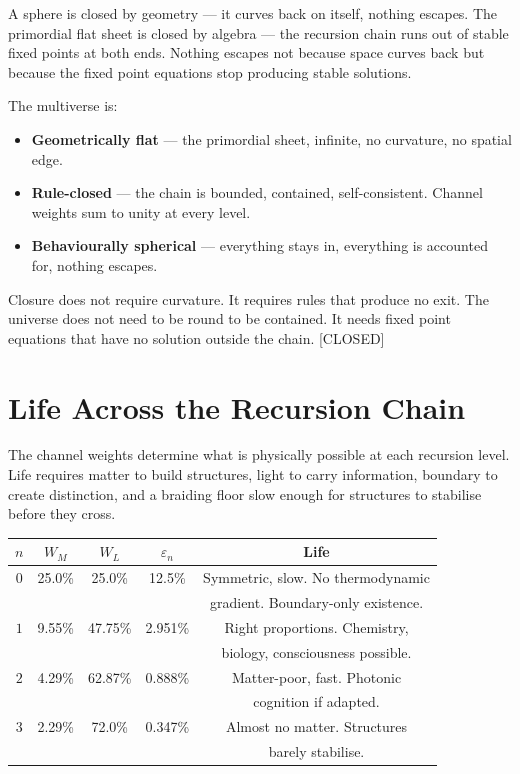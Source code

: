 \documentclass[prd,twocolumn,preprintnumbers,amsmath,amssymb]{revtex4-2}
\newcommand{\closed}{\textcolor{green!60!black}{[CLOSED]}}
\begin{document}
A sphere is closed by geometry --- it curves back on itself,
nothing escapes. The primordial flat sheet is closed by algebra
--- the recursion chain runs out of stable fixed points at both
ends. Nothing escapes not because space curves back but because
the fixed point equations stop producing stable solutions.

The multiverse is:
\begin{itemize}
  \item \textbf{Geometrically flat} --- the primordial sheet,
        infinite, no curvature, no spatial edge.
  \item \textbf{Rule-closed} --- the chain is bounded, contained,
        self-consistent. Channel weights sum to unity at every
        level.
  \item \textbf{Behaviourally spherical} --- everything stays in,
        everything is accounted for, nothing escapes.
\end{itemize}

Closure does not require curvature. It requires rules that
produce no exit. The universe does not need to be round to be
contained. It needs fixed point equations that have no solution
outside the chain. \closed

\section{Life Across the Recursion Chain}
\label{sec:life}

The channel weights determine what is physically possible at each
recursion level. Life requires matter to build structures, light
to carry information, boundary to create distinction, and a
braiding floor slow enough for structures to stabilise before
they cross.

\begin{ruledtabular}
\begin{tabular}{ccccc}
$n$ & $W_M$ & $W_L$ & $\varepsilon_n$ & Life \\
\hline
$0$ & 25.0\% & 25.0\% & 12.5\% & Symmetric, slow. No thermodynamic \\
    &        &        &        & gradient. Boundary-only existence. \\
$1$ & 9.55\% & 47.75\% & 2.951\% & Right proportions. Chemistry, \\
    &        &         &         & biology, consciousness possible. \\
$2$ & 4.29\% & 62.87\% & 0.888\% & Matter-poor, fast. Photonic \\
    &        &         &         & cognition if adapted. \\
$3$ & 2.29\% & 72.0\%  & 0.347\% & Almost no matter. Structures \\
    &        &         &         & barely stabilise. \\
\end{tabular}
\end{ruledtabular}
\end{document}
